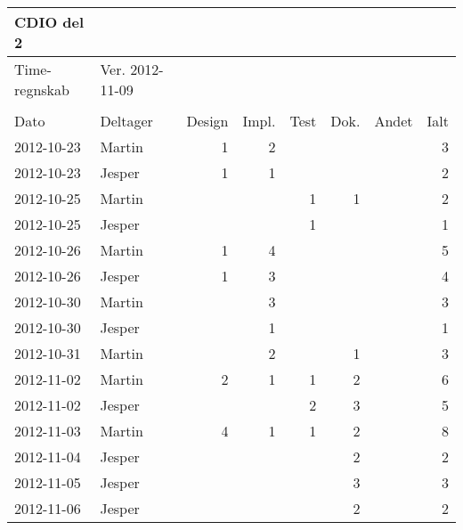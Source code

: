 \begin{table}[htbp]
  \centering
    \begin{tabular}{|l|l|r|r|r|r|r|r|}
    \hline
    CDIO del 2 &       &       &       &       &       &       &  \bigstrut\\
    \hline
    Time-regnskab & Ver. 2012-11-09 &       &       &       &       &       &  \bigstrut\\
    \hline
          &       &       &       &       &       &       &  \bigstrut\\
    \hline
    Dato  & Deltager & Design & Impl. & Test  & Dok.  & Andet & Ialt \bigstrut\\
    \hline
    2012-10-23 & Martin & 1     & 2     &       &       &       & 3 \bigstrut\\
    \hline
    2012-10-23 & Jesper & 1     & 1     &       &       &       & 2 \bigstrut\\
    \hline
    2012-10-25 & Martin &       &       & 1     & 1     &       & 2 \bigstrut\\
    \hline
    2012-10-25 & Jesper &       &       & 1     &       &       & 1 \bigstrut\\
    \hline
    2012-10-26 & Martin & 1     & 4     &       &       &       & 5 \bigstrut\\
    \hline
    2012-10-26 & Jesper & 1     & 3     &       &       &       & 4 \bigstrut\\
    \hline
    2012-10-30 & Martin &       & 3     &       &       &       & 3 \bigstrut\\
    \hline
    2012-10-30 & Jesper &       & 1     &       &       &       & 1 \bigstrut\\
    \hline
    2012-10-31 & Martin &       & 2     &       & 1     &       & 3 \bigstrut\\
    \hline
    2012-11-02 & Martin & 2     & 1     & 1     & 2     &       & 6 \bigstrut\\
    \hline
    2012-11-02 & Jesper &       &       & 2     & 3     &       & 5 \bigstrut\\
    \hline
    2012-11-03 & Martin & 4     & 1     & 1     & 2     &       & 8 \bigstrut\\
    \hline
    2012-11-04 & Jesper &       &       &       & 2     &       & 2 \bigstrut\\
    \hline
    2012-11-05 & Jesper &       &       &       & 3     &       & 3 \bigstrut\\
    \hline
    2012-11-06 & Jesper &       &       &       & 2     &       & 2 \bigstrut\\

\end{tabular}
\end{table}
